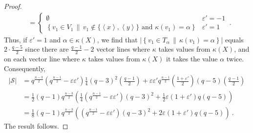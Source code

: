 \documentclass[a4paper]{article}
\theoremstyle{definition}
\newcommand{\eps}{\varepsilon}
\newcommand{\vspan}[1]{\left \langle #1 \right \rangle}
\begin{document}
\begin{proof}
\begin{align*}
        &=\begin{cases}
        \emptyset&\eps'=-1\\
        \left\{v_{1}\in V_{1}\, \| \, v_{1}\notin\{\vspan{x},\vspan{y}\} \text{ and }\kappa(v_{1})=\alpha\right\}&\eps'=1
        \end{cases}
        \:.
    \end{align*}
    Thus, if $\eps'=1$ and $\alpha\in \kappa(X)$, we find that $\left|\left\{v_{1}\in T_{\alpha}\, \| \,\kappa(v_{1})=\alpha\right\}\right|$ equals $2\cdot \frac{q-5}{2}$ since there are $\frac{q-1}{2}-2$ vector lines where $\kappa$ takes values from $\kappa(X)$, and on each vector line where $\kappa$ takes values from $\kappa(X)$ it takes the value $\alpha$ twice. Consequently,
    \begin{align*}
        |\mathcal{S}|&=q^{\frac{n-3}{2}}\left(q^{\frac{n-1}{2}}-\eps\eps'\right)\frac{1}{4}(q-3)^{2}\left(\frac{q-1}{2}\right)+\eps\eps'q^{\frac{n-1}{2}}\left(\frac{1+\eps'}{2}\right)(q-5)\left(\frac{q-1}{2}\right)\\
        &=\frac{1}{2}(q-1)q^{\frac{n-3}{2}}\left(\frac{1}{4}\left(q^{\frac{n-1}{2}}-\eps\eps'\right)(q-3)^{2}+\frac{1}{2}\eps\left(1+\eps'\right)q(q-5)\right)\\
        &=\frac{1}{8}(q-1)q^{\frac{n-3}{2}}\left(\left(q^{\frac{n-1}{2}}-\eps\eps'\right)(q-3)^{2}+2\eps\left(1+\eps'\right)q(q-5)\right)\:.
    \end{align*}
    The result follows.
\end{proof}
\end{document}
